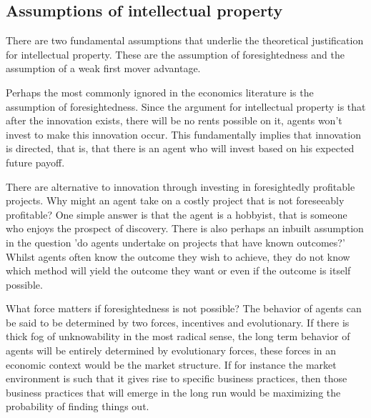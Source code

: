 \documentclass[12pt]{article}
\numberwithin{equation}{section}
\begin{document}


\subsection{Assumptions of intellectual property}

There are two fundamental assumptions that underlie the theoretical justification for intellectual property. These are the assumption of foresightedness and the assumption of a weak first mover advantage.

Perhaps the most commonly ignored in the economics literature is the assumption of foresightedness. Since the argument for intellectual property is that after the innovation exists, there will be no rents possible on it, agents won't invest to make this innovation occur. This fundamentally implies that innovation is directed, that is, that there is an agent who will invest based on his expected future payoff.

There are alternative to innovation through investing in foresightedly profitable projects. Why might an agent take on a costly project that is not foreseeably profitable? One simple answer is that the agent is a hobbyist, that is someone who enjoys the prospect of discovery. There is also perhaps an inbuilt assumption in the question 'do agents undertake on projects that have known outcomes?' Whilst agents often know the outcome they wish to achieve, they do not know which method will yield the outcome they want or even if the outcome is itself possible. 

What force matters if foresightedness is not possible? The behavior of agents can be said to be determined by two forces, incentives and evolutionary. If there is thick fog of unknowability in the most radical sense, the long term behavior of agents will be entirely determined by evolutionary forces, these forces in an economic context would be the market structure. If for instance the market environment is such that it gives rise to specific business practices, then those business practices that will emerge in the long run would be maximizing the probability of finding things out. 
\end{document}
